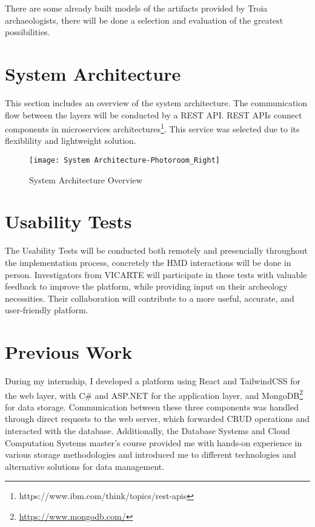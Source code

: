 There are some already built models of the artifacts provided by Troia archaeologists, there will be done a selection and evaluation of the greatest possibilities.


\section{System Architecture}
\label{sec:architecture}

This section includes an overview of the system architecture. The communication flow between the layers will be conducted by a REST \gls{API}.
REST \glspl{API} connect components in microservices architectures\footnote{{https://www.ibm.com/think/topics/rest-apis}}.
This service was selected due to its flexiblility and lightweight solution. 

\begin{figure}[h!]
    \centering
    \texttt{[image: System Architecture-Photoroom\_Right]}
    \caption{System Architecture Overview}
    \label{fig:architecture}
  \end{figure}
  \FloatBarrier


\section{Usability Tests}
\label{sec:usability_tests}

The Usability Tests will be conducted both remotely and presencially throughout the implementation process, concretely the \gls{HMD} interactions will be done in person.
Investigators from \gls{VICARTE} will participate in these tests with valuable feedback to improve the platform, while providing input on their archeology necessities. Their collaboration will contribute to a more useful, accurate, and user-friendly platform.

\section{Previous Work}
\label{sec:previous_work}

During my internship, I developed a platform using React and TailwindCSS for the web layer, with C\# and ASP.NET for the application layer, and MongoDB\footnote{\url{https://www.mongodb.com/}} for data storage. Communication between these three components was handled through direct requests to the web server, which forwarded \gls{CRUD} operations and interacted with the database.  
Additionally, the Database Systems and Cloud Computation Systems master's course provided me with hands-on experience in various storage methodologies and introduced me to different technologies and alternative solutions for data management.

